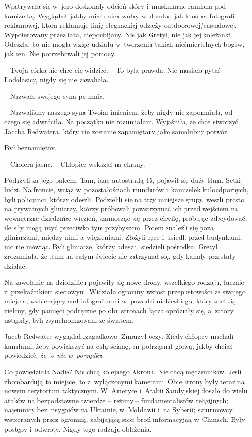 \documentclass[oneside,polish,11pt,sfheadings]{mwbk}
\begin{document}
Wpatrywała się w~jego doskonały odcień skóry i~muskularne ramiona pod
kamizelką. Wyglądał, jakby miał dzień wolny w~domku, jak ktoś na
fotografii reklamowej, która reklamuje linię eleganckiej odzieży
outdoorowej/casualowej. Wypolerowany przez lata, niepoobijany. Nie jak
Gretyl, nie jak jej koleżanki. Odeszła, bo nie mogła wziąć udziału w~tworzeniu takich nieśmiertelnych bogów, jak ten. Nie potrzebowali jej
pomocy.

-- Twoja córka nie chce cię widzieć. -- To była prawda. Nie musiała pytać
Lodołasicy, nigdy się nie zawahała.

-- Nazwała swojego syna po mnie.

-- Nazwaliśmy naszego syna Twoim imieniem, żeby nigdy nie zapomniała, od
czego się odwróciła. Na początku nie rozumiałam. Wyjaśniła, że chce
stworzyć Jacoba Redwatera, który nie zostanie zapamiętany jako samolubny
potwór.

Był beznamiętny.

-- Cholera jasna. -- Chłopiec wskazał na ekrany.

Podążyli za jego palcem. Tam, idąc autostradą 15, pojawił się duży tłum.
Setki ludzi. Na froncie, wciąż w~pozostałościach mundurów i~kamizelek
kuloodpornych, byli policjanci, którzy odeszli. Podzielili się na trzy
mniejsze grupy, weszli prosto na prywatnych gliniarzy, którzy próbowali
powstrzymać ich przed wejściem na wewnętrzne dziedzińce więzień,
szamocząc się przez chwilę, próbując zdecydować, ile siły mogą użyć
przeciwko tym przybyszom. Potem znaleźli się poza gliniarzami, między
nimi a~więzieniami. Złożyli ręce i~usiedli przed budynkami, nic nie
mówiąc. Byli gliniarze, którzy odeszli, siedzieli pośrodku. Gretyl
zrozumiała, że tłum na całym świecie nie zatrzymał się, gdy kanały
przestały działać.

Na zawołanie na dziedzińcu pojawiły się nowe drony, wszelkiego rodzaju,
łącznie z~przekaźnikiem sieciowym. Widziała ogromny wzrost
przepustowości ze swojego miejsca, wzbierający nad infografikami w~powodzi niebieskiego, który stał się zielony, gdy pamięci podręczne po
obu stronach łącza opróżniły się, a~zatory ustąpiły, byli
zsynchronizowani ze światem.

Jacob Redwater wyglądał\ldots  zagadkowo. Zmrużył oczy. Kiedy chłopcy
machali kanałami, żeby powiększyć na całą ścianę, on potrząsnął głową,
jakby chciał powiedzieć, \textit{że to nie w~porządku}.

Co powiedziała Nadie? Nie chcą kolejnego Akronu. Nie chcą męczenników.
Jeśli zbombardują to miejsce, to z~wyłączonymi kamerami. Obie strony
były teraz na nowym terytorium taktycznym. W~Ameryce i~Arabii
Saudyjskiej doszło do wielu ataków na bezpodstawne twierdze -- reżimy -- fundamentalistów religijnych; najemnicy bez insygniów na Ukrainie, w~Mołdawii i~na Syberii; szturmowcy wspieranych przez ogromną, zabijającą
sieci broń informacyjną w~Chinach. Były postępy i~odwroty. Nigdy tego
rodzaju oblężenia.
\end{document}
